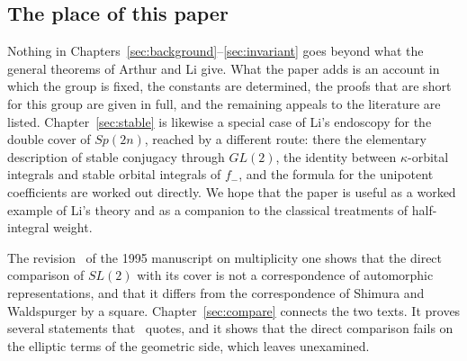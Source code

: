 \subsection*{The place of this paper}

Nothing in
Chapters~\ref{sec:background}--\ref{sec:invariant} goes beyond what the
general theorems of Arthur and Li give. What the paper adds is an
account in which the group is fixed, the constants are determined, the
proofs that are short for this group are given in full, and the
remaining appeals to the literature are listed. Chapter~\ref{sec:stable}
is likewise a special case of Li's endoscopy for the double cover of
$Sp(2n)$, reached by a different route: there the elementary description
of stable conjugacy through $GL(2)$, the identity between
$\kappa$-orbital integrals and stable orbital integrals of $f_-$, and the
formula for the unipotent coefficients are worked out directly. We hope
that the paper is useful as a worked example of Li's theory and as a
companion to the classical treatments of half-integral weight.

The revision~\cite{JC26} of the 1995 manuscript on multiplicity one shows
that the direct comparison of $SL(2)$ with its cover is not a
correspondence of automorphic representations, and that it differs from
the correspondence of Shimura and Waldspurger by a square.
Chapter~\ref{sec:compare} connects the two texts. It proves several
statements that~\cite{JC26} quotes, and it shows that the direct
comparison fails on the elliptic terms of the geometric side, which
\cite{JC26} leaves unexamined.
